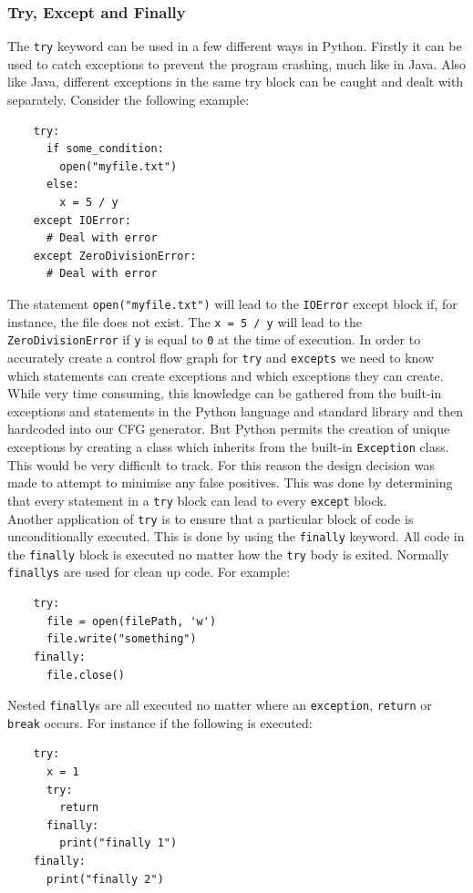 \documentclass[12pt, titlepage]{article}
\begin{document}
\subsubsection{Try, Except and Finally}
The \texttt{try} keyword can be used in a few different ways in Python. Firstly it can be used to catch exceptions to prevent the program crashing, much like in Java. Also like Java, different exceptions in the same try block can be caught and dealt with separately. Consider the following example:
\begin{lstlisting}
    try:
      if some_condition:
        open("myfile.txt")
      else:
        x = 5 / y        
    except IOError:
      # Deal with error
    except ZeroDivisionError:
      # Deal with error
\end{lstlisting}
The statement \texttt{open("myfile.txt")} will lead to the \texttt{IOError} except block if, for instance, the file does not exist. The \texttt{x = 5 / y} will lead to the \texttt{ZeroDivisionError} if \texttt{y} is equal to \texttt{0} at the time of execution. In order to accurately create a control flow graph for \texttt{try} and \texttt{excepts} we need to know which statements can create exceptions and which exceptions they can create. While very time consuming, this knowledge can be gathered from the built-in exceptions and statements in the Python language and standard library and then hardcoded into our CFG generator. But Python permits the creation of unique exceptions by creating a class which inherits from the built-in \texttt{Exception} class. This would be very difficult to track. For this reason the design decision was made to attempt to minimise any false positives. This was done by determining that every statement in a \texttt{try} block can lead to every \texttt{except} block. \\
\indent Another application of \texttt{try} is to ensure that a particular block of code is unconditionally executed. This is done by using the \texttt{finally} keyword. All code in the \texttt{finally} block is executed no matter how the \texttt{try} body is exited. Normally \texttt{finallys} are used for clean up code. For example:
\begin{lstlisting}
    try:
      file = open(filePath, 'w')
      file.write("something")
    finally:
      file.close()
\end{lstlisting}
\indent Nested \texttt{finally}s are all executed no matter where an \texttt{exception}, \texttt{return} or \texttt{break} occurs. For instance if the following is executed:
\begin{lstlisting}
    try:
      x = 1
      try:
        return
      finally:
        print("finally 1")
    finally:
      print("finally 2")
\end{lstlisting}
\end{document}

